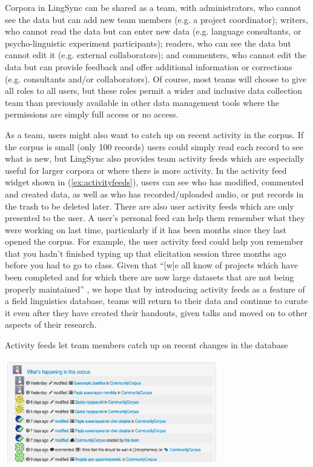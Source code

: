 \documentclass[letterpaper, 12pt, dvips]{mitwpl}
\begin{document}
Corpora in LingSync can be shared as a team,
with administrators,
who cannot see the data
but can add new team members (e.g.
a project coordinator); writers,
who cannot read the data but can enter new data (e.g.
language consultants,
or psycho-linguistic experiment participants); readers,
who can see the data but cannot edit it (e.g.
external collaborators); and commenters,
 who cannot edit the data but can provide feedback and offer additional information or corrections (e.g.
consultants and/or collaborators).
 Of course,
most teams will choose to give all roles to all users,
but these roles permit a wider and inclusive data collection team than previously available  in other data management tools where the permissions are simply full access or no access.

As a team,
users might also want to catch up on recent activity in the corpus.
If the corpus is small (only 100 records) users could simply read each record to see what is new,
but LingSync also provides team activity feeds which are especially useful for larger corpora or where there is more activity.
In the activity feed widget shown in (\ref{ex:activityfeeds}), users can see who has modified,
commented and
created data,
as well as who has recorded/uploaded audio,
or put records in the trash to be deleted later.
There are also user activity feeds which are only presented to the user. %
A user's personal feed  can help them remember what they were working on last time,
particularly if it has been months since they last opened the corpus.
For example,
the user activity feed could help you remember that you hadn't finished typing up that elicitation session three months ago before you had to go to class.
Given that ``[w]e all know of projects which have been completed and for which there are now large datasets that are not being properly maintained'' \citep[p.133]{Thieberger:2012}, we hope that by introducing activity feeds as a feature of a field linguistics database, teams will return to their data and continue to curate it even after they have created their handouts, given talks and moved on to other aspects of their research. 

\begin{exe} 
\ex Activity feeds let team members catch up on recent changes in the database

 \centering
   \includegraphics[width=0.7\textwidth]{activityfeeds} 

\label{ex:activityfeeds}
\end{exe}
\end{document}
